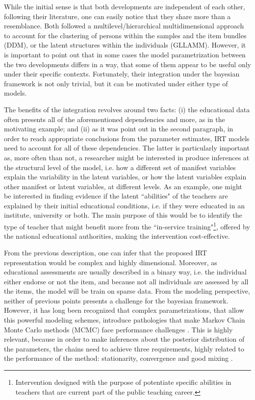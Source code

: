 While the initial sense is that both developments are independent of each other, following their literature, one can easily notice that they share more than a resemblance. Both followed a multilevel/hierarchical multidimensional approach to account for the clustering of persons within the samples and the item bundles (DDM), or the latent structures within the individuals (GLLAMM). However, it is important to point out that in some cases the model parametrization between the two developments differs in a way, that some of them appear to be useful only under their specific contexts. Fortunately, their integration under the bayesian framework is not only trivial, but it can be motivated under either type of models.

The benefits of the integration revolves around two facts: (i) the educational data often presents all of the aforementioned dependencies and more, as in the motivating example; and (ii) as it was point out in the second paragraph, in order to reach appropriate conclusions from the parameter estimates, IRT models need to account for all of these dependencies. The latter is particularly important as, more often than not, a researcher might be interested in produce inferences at the structural level of the model, i.e. how a different set of manifest variables explain the variability in the latent variables, or how the latent variables explain other manifest or latent variables, at different levels. As an example, one might be interested in finding evidence if the latent ``abilities" of the teachers are explained by their initial educational conditions, i.e. if they were educated in an institute, university or both. The main purpose of this would be to identify the type of teacher that might benefit more from the ``in-service training"\footnote{Intervention designed with the purpose of potentiate specific abilities in teachers that are current part of the public teaching career.}, offered by the national educational authorities, making the intervention cost-effective.

From the previous description, one can infer that the proposed IRT representation would be complex and highly dimensional. Moreover, as educational assessments are usually described in a binary way, i.e. the individual either endorse or not the item, and because not all individuals are assessed by all the items, the model will be train on sparse data. From the modeling perspective, neither of previous points presents a challenge for the bayesian framework. However, it has long been recognized that complex parametrizations, that allow this powerful modeling schemes, introduce pathologies that make Markov Chain Monte Carlo methods (MCMC)  face performance challenges \cite{Gelfand_et_al_1995, Gelfand_et_al_1996, Papaspiliopoulos_et_al_2003, Papaspiliopoulos_et_al_2007, Betancourt_et_al_2013}. This is highly relevant, because in order to make inferences about the posterior distribution of the parameters, the chains need to achieve three requirements, highly related to the performance of the method: stationarity, convergence and good mixing \cite{McElreath_2020}.

